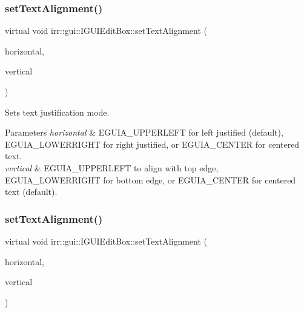 \subsubsection{\texorpdfstring{set\+Text\+Alignment()}{setTextAlignment()}\hspace{0.1cm}{\footnotesize\ttfamily [1/2]}}
{\footnotesize\ttfamily virtual void irr\+::gui\+::\+I\+G\+U\+I\+Edit\+Box\+::set\+Text\+Alignment (\begin{DoxyParamCaption}\item[{\hyperlink{namespaceirr_1_1gui_a19eb5fb40e67f108cb16aba922ddaa2d}{E\+G\+U\+I\+\_\+\+A\+L\+I\+G\+N\+M\+E\+NT}}]{horizontal,  }\item[{\hyperlink{namespaceirr_1_1gui_a19eb5fb40e67f108cb16aba922ddaa2d}{E\+G\+U\+I\+\_\+\+A\+L\+I\+G\+N\+M\+E\+NT}}]{vertical }\end{DoxyParamCaption})\hspace{0.3cm}{\ttfamily [pure virtual]}}



Sets text justification mode. 


\begin{DoxyParams}{Parameters}
{\em horizontal} & E\+G\+U\+I\+A\+\_\+\+U\+P\+P\+E\+R\+L\+E\+FT for left justified (default), E\+G\+U\+I\+A\+\_\+\+L\+O\+W\+E\+R\+R\+I\+G\+HT for right justified, or E\+G\+U\+I\+A\+\_\+\+C\+E\+N\+T\+ER for centered text. \\
\hline
{\em vertical} & E\+G\+U\+I\+A\+\_\+\+U\+P\+P\+E\+R\+L\+E\+FT to align with top edge, E\+G\+U\+I\+A\+\_\+\+L\+O\+W\+E\+R\+R\+I\+G\+HT for bottom edge, or E\+G\+U\+I\+A\+\_\+\+C\+E\+N\+T\+ER for centered text (default). \\
\hline
\end{DoxyParams}
\mbox{\label{classirr_1_1gui_1_1IGUIEditBox_ab1e2379940983f4ff874f5143f6d7244}} 
\subsubsection{\texorpdfstring{set\+Text\+Alignment()}{setTextAlignment()}\hspace{0.1cm}{\footnotesize\ttfamily [2/2]}}
{\footnotesize\ttfamily virtual void irr\+::gui\+::\+I\+G\+U\+I\+Edit\+Box\+::set\+Text\+Alignment (\begin{DoxyParamCaption}\item[{\hyperlink{namespaceirr_1_1gui_a19eb5fb40e67f108cb16aba922ddaa2d}{E\+G\+U\+I\+\_\+\+A\+L\+I\+G\+N\+M\+E\+NT}}]{horizontal,  }\item[{\hyperlink{namespaceirr_1_1gui_a19eb5fb40e67f108cb16aba922ddaa2d}{E\+G\+U\+I\+\_\+\+A\+L\+I\+G\+N\+M\+E\+NT}}]{vertical }\end{DoxyParamCaption})\hspace{0.3cm}{\ttfamily [pure virtual]}}



